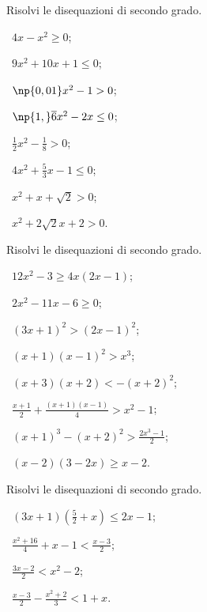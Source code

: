 \begin{esercizio}[\Ast]
 \label{ese:4.11}
Risolvi le disequazioni di secondo grado.
\begin{multicols}{3}
 \begin{enumeratea}
 \item~$4x-x^2\ge 0$;
 \item~$9x^2+10x+1\le 0$;
 \item~$\np{0,01}x^2-1>0$;
 \item~$\np{1,}\overline{6}x^2-2x\le 0$;
 \item~$\frac 1 2x^2-\frac 1 8>0$;
 \item~$4x^2+\frac 5 3x-1\le 0$;
 \item~$x^2+x+\sqrt 2>0$;
 \item~$x^2+2\sqrt 2x+2>0$.
 \end{enumeratea}
 \end{multicols}
\end{esercizio}
\pagebreak
\begin{esercizio}[\Ast]
 \label{ese:4.12}
Risolvi le disequazioni di secondo grado.
\begin{multicols}{2}
 \begin{enumeratea}
 \item~$12x^2-3\ge 4x(2x-1)$;
 \item~$2x^2-11x-6\ge 0$;
 \item~$(3x+1)^2>(2x-1)^2$;
 \item~$(x+1)(x-1)^2>x^3$;
 \item~$(x+3)(x+2)<-(x+2)^2$;
 \item~$\frac{x+1} 2+\frac{(x+1)(x-1)} 4>x^2-1$;
 \item~$(x+1)^3-(x+2)^2>\frac{2x^3-1} 2$;
 \item~$(x-2)(3-2x)\ge x-2$.
 \end{enumeratea}
 \end{multicols}
\end{esercizio}

\begin{esercizio}[\Ast]
 \label{ese:4.13}
Risolvi le disequazioni di secondo grado.
\begin{multicols}{2}
 \begin{enumeratea}
 \item~$(3x+1)\left(\frac 5 2+x\right)\le 2x-1$;
 \item~$\frac{x^2+16} 4+x-1<\frac{x-3} 2$;
 \item~$\frac{3x-2} 2<x^2-2$;
 \item~$\frac{x-3} 2-\frac{x^2+2} 3<1+x$.
 \end{enumeratea}
 \end{multicols}
\end{esercizio}


